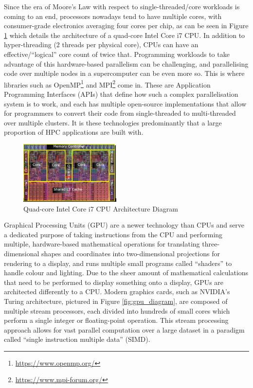 \documentclass[conference]{IEEEtran}
\begin{document}
Since the era of Moore’s Law with respect to single-threaded/core workloads is coming to an end\cite{mooreslaw}, processors nowadays tend to have multiple cores, with consumer-grade electronics averaging four cores per chip, as can be seen in Figure \ref{fig:cpu_diagram} which details the architecture of a quad-core Intel Core i7 CPU. In addition to hyper-threading (2 threads per physical core), CPUs can have an effective/``logical” core count of twice that. Programming workloads to take advantage of this hardware-based parallelism can be challenging, and parallelising code over multiple nodes in a supercomputer can be even more so. This is where libraries such as OpenMP\footnote{\url{https://www.openmp.org/}} and MPI\footnote{\url{https://www.mpi-forum.org/}} come in. These are Application Programming Interfaces (APIs) that define how such a complex parallelisation system is to work, and each has multiple open-source implementations that allow for programmers to convert their code from single-threaded to multi-threaded over multiple clusters. It is these technologies predominantly that a large proportion of HPC applications are built with.

\begin{figure}
\centering
\includegraphics[width=0.45\textwidth]{images/cpu_diagram.png}
\caption{Quad-core Intel Core i7 CPU Architecture Diagram}
\label{fig:cpu_diagram}
\end{figure}

Graphical Processing Units (GPU) are a newer technology than CPUs and serve a dedicated purpose of taking instructions from the CPU and performing multiple, hardware-based mathematical operations for translating three-dimensional shapes and coordinates into two-dimensional projections for rendering to a display, and runs multiple small programs called ``shaders” to handle colour and lighting. Due to the sheer amount of mathematical calculations that need to be performed to display something onto a display, GPUs are architected differently to a CPU. Modern graphics cards, such as NVIDIA’s Turing architecture, pictured in Figure \ref{fig:gpu_diagram}, are composed of multiple stream processors, each divided into hundreds of small cores which perform a single integer or floating-point operation. This stream processing approach allows for vast parallel computation over a large dataset in a paradigm called ``single instruction multiple data” (SIMD).
\end{document}
